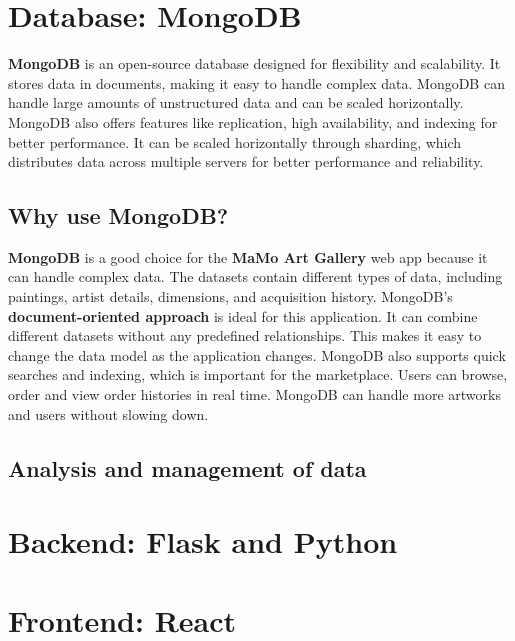 \documentclass[a4paper,12pt]{article}
\begin{document}
\newpage
\section{Database: MongoDB}
\justify

\textbf{MongoDB} is an open-source database designed for flexibility and scalability. It stores data in documents, making it easy to handle complex data. MongoDB can handle large amounts of unstructured data and can be scaled horizontally. MongoDB also offers features like replication, high availability, and indexing for better performance. It can be scaled horizontally through sharding, which distributes data across multiple servers for better performance and reliability.


\subsection{Why use MongoDB?}
\justify
\textbf{MongoDB} is a good choice for the \textbf{MaMo Art Gallery} web app because it can handle complex data. The datasets contain different types of data, including paintings, artist details, dimensions, and acquisition history. MongoDB's \textbf{document-oriented approach} is ideal for this application. It can combine different datasets without any predefined relationships. This makes it easy to change the data model as the application changes.
MongoDB also supports quick searches and indexing, which is important for the marketplace. Users can browse, order and view order histories in real time. MongoDB can handle more artworks and users without slowing down.

\subsection{Analysis and management of data}
\justify





\section{Backend: Flask and Python}
\justify

\section{Frontend: React}
\justify
\end{document}
